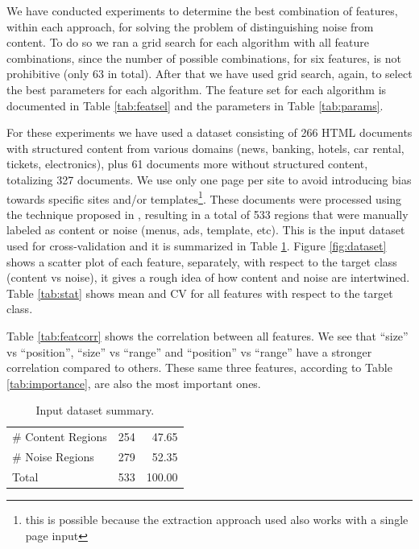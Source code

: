 We have conducted experiments to determine the best combination of features,
within each approach, for solving the problem of distinguishing noise from
content. To do so we ran a grid search for each algorithm with all feature
combinations, since the number of possible combinations, for six features, is
not prohibitive (only 63 in total).
After that we have used grid search, again, to select the best parameters for
each algorithm. The feature set for each algorithm is documented in Table
\ref{tab:featsel} and the parameters in Table \ref{tab:params}.

For these experiments we have used a dataset consisting of 266 HTML documents
with structured content from various domains (news, banking, hotels, car rental,
tickets, electronics), plus 61 documents more without structured content,
totalizing 327 documents.
We use only one page per site to avoid introducing bias towards specific sites and/or
templates\footnote{this is possible because the extraction approach used also
works with a single page input}. These documents were processed using the
technique proposed in \cite{Velloso:2017:ERW:3132847.3132875}, resulting in a
total of 533 regions that were manually labeled as content or noise (menus, ads,
template, etc). This is the input dataset used for cross-validation and it is
summarized in Table \ref{tab:dataset}. Figure \ref{fig:dataset} shows a scatter
plot of each feature, separately, with respect to the target class (content vs
noise), it gives a rough idea of how content and noise are intertwined. Table
\ref{tab:stat} shows mean and CV for all features with respect to the target
class.

Table \ref{tab:featcorr} shows the correlation between all features. We see that
``size'' vs ``position'', ``size'' vs ``range'' and ``position'' vs ``range''
have a stronger correlation compared to others. These same three features,
according to Table \ref{tab:importance}, are also the most important ones.

 
\begin{table}[h]
\centering
\caption{Input dataset summary.}
\label{tab:dataset}
\begin{tabular}{ | l | l | r |}
\hline
\# Content Regions & 254 & 47.65 \\
\# Noise Regions & 279 & 52.35 \\
\hline
Total & 533 & 100.00 \\
\hline
\end{tabular}
\end{table}

